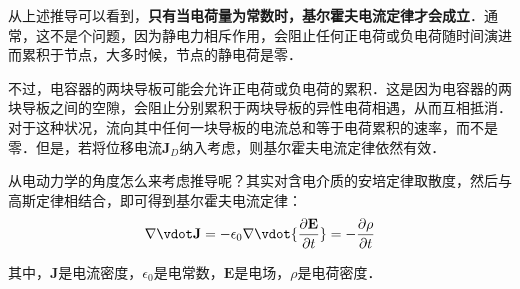 从上述推导可以看到，\textbf{只有当电荷量为常数时，基尔霍夫电流定律才会成立}．通常，这不是个问题，因为静电力相斥作用，会阻止任何正电荷或负电荷随时间演进而累积于节点，大多时候，节点的静电荷是零．

不过，电容器的两块导板可能会允许正电荷或负电荷的累积．这是因为电容器的两块导板之间的空隙，会阻止分别累积于两块导板的异性电荷相遇，从而互相抵消．对于这种状况，流向其中任何一块导板的电流总和等于电荷累积的速率，而不是零．但是，若将位移电流$\mathbf{J}_D$纳入考虑，则基尔霍夫电流定律依然有效．

从电动力学的角度怎么来考虑推导呢？其实对含电介质的安培定律取散度，然后与高斯定律相结合，即可得到基尔霍夫电流定律：
\begin{equation}
\nabla \vdot \mathbf {J} =-\epsilon _{0}\nabla \vdot {\frac {\partial \mathbf {E} }{\partial t}}=-{\frac {\partial \rho }{\partial t}}
\end{equation}

其中，$\mathbf{J}$是电流密度，$\epsilon_0$是电常数，$\mathbf{E}$是电场，$\rho$是电荷密度．

